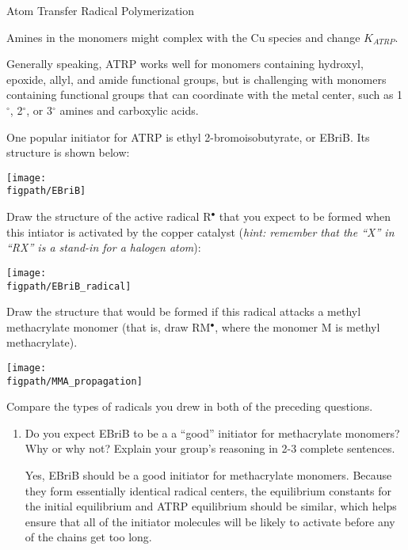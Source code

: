 \begin{activity}{Atom Transfer Radical Polymerization}
\begin{ctqs}
		\begin{solution}[1.25in]{}
			Amines in the monomers might complex with the Cu species and change $K_{ATRP}$.
			
			Generally speaking, ATRP works well for monomers containing hydroxyl, epoxide, allyl, and amide functional groups, but is challenging with monomers containing functional groups that can coordinate with the metal center, such as 1$^\circ$, 2$^\circ$, or 3$^\circ$ amines and carboxylic acids.
		\end{solution}
	
\end{ctqs}

\begin{infobox}
	One popular initiator for ATRP is ethyl 2-bromoisobutyrate, or EBriB.  Its structure is shown below:
	
	\centerline{\texttt{[image: \\figpath/EBriB]}}
\end{infobox}

\begin{ctqs}
	\question Draw the structure of the active radical R$^\bullet$ that you expect to be formed when this intiator is activated by the copper catalyst (\emph{hint: remember that the ``X'' in ``RX'' is a stand-in for a halogen atom}): \label{\labelbase:ctq:ATRPinit}
	
		\begin{solution}[0.5in]{}
			\centerline{\texttt{[image: \\figpath/EBriB\_radical]}}	
		\end{solution}
	
	\question Draw the structure that would be formed if this radical attacks a methyl methacrylate monomer (that is, draw RM$^\bullet$, where the monomer M is methyl methacrylate). \label{\labelbase:ctq:ATRPprop}
	
		\begin{solution}[1in]{}
			\centerline{\texttt{[image: \\figpath/MMA\_propagation]}}	
		\end{solution}
	
	\question Compare the types of radicals you drew in both of the preceding questions.
	
		\begin{enumerate}
			\item Do you expect EBriB to be a a ``good'' initiator for methacrylate monomers?  Why or why not?  Explain your group's reasoning in 2-3 complete sentences.
	
			\begin{solution}[1.25in]{}
				Yes, EBriB should be a good initiator for methacrylate monomers.  Because they form essentially identical radical centers, the equilibrium constants for the initial equilibrium and ATRP equilibrium should be similar, which helps ensure that all of the initiator molecules will be likely to activate before any of the chains get too long.
				

\end{solution}
\end{enumerate}
\end{ctqs}
\end{activity}
